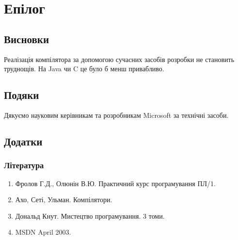 \documentclass{memoir}
\begin{document}
\chapter{Епілог}
\section{Висновки}
Реалізація компілятора за допомогою сучасних засобів розробки не становить труднощів. На Java чи C це було б менш привабливо.

\section{Подяки}
Дякуємо науковим керівникам та розробникам Microsoft за технічні засоби.

\section{Додатки}
\subsection{Література}
\begin{enumerate}
    \item Фролов Г.Д., Олюнін В.Ю. Практичний курс програмування ПЛ/1.
    \item Ахо, Сеті, Ульман. Компілятори.
    \item Дональд Кнут. Мистецтво програмування. 3 томи.
    \item MSDN April 2003.
\end{enumerate}
\end{document}
